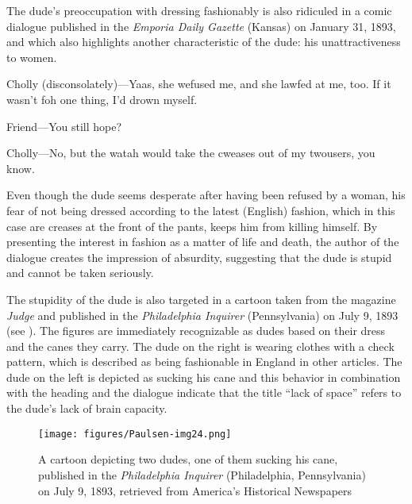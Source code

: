 \largerpage

The dude’s preoccupation with dressing fashionably is also ridiculed in a comic dialogue published in the \textit{Emporia Daily Gazette} (Kansas) on January 31, 1893, and which also highlights another characteristic of the dude: his unattractiveness to women.

\begin{ipquote}
\begin{center}
\end{center}
Cholly (disconsolately)—Yaas, she wefused me, and she lawfed at me, too. If it wasn’t foh one thing, I’d drown myself.

Friend—You still hope?

Cholly—No, but the watah would take the cweases out of my twousers, you know.
\end{ipquote}


Even though the dude seems desperate after having been refused by a woman, his fear of not being dressed according to the latest (English) fashion, which in this case are creases at the front of the pants, keeps him from killing himself. By presenting the interest in fashion as a matter of life and death, the author of the dialogue creates the impression of absurdity, suggesting that the dude is stupid and cannot be taken seriously.


The stupidity of the dude is also targeted in a cartoon taken from the magazine \emph{Judge} and published in the \emph{Philadelphia Inquirer} (Pennsylvania) on July 9, 1893 (see ). The figures are immediately recognizable as dudes based on their dress and the canes they carry. The dude on the right is wearing clothes with a check pattern, which is described as being fashionable in England in other articles. The dude on the left is depicted as sucking his cane and this behavior in combination with the heading and the dialogue indicate that the title “lack of space” refers to the dude’s lack of brain capacity.

\begin{figure}
\texttt{[image: figures/Paulsen-img24.png]}
\caption{
A cartoon depicting two dudes, one of them sucking his cane, published in the \emph{Philadelphia Inquirer} (Philadelphia, Pennsylvania) on July 9, 1893, retrieved from America's Historical Newspapers
}
\label{fig:key:24}
\end{figure}

